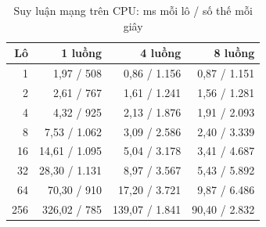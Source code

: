 \begin{table}[H]
  \centering
  \small
  \caption{Suy luận mạng trên CPU: ms mỗi lô / số thế mỗi giây}
  \label{tab:cs-tk-thongluong}
  \begin{tabular}{rrrr}
    \toprule
    Lô & 1 luồng & 4 luồng & 8 luồng \\
    \midrule
    1 & 1,97 / 508 & 0,86 / 1.156 & 0,87 / 1.151 \\
    2 & 2,61 / 767 & 1,61 / 1.241 & 1,56 / 1.281 \\
    4 & 4,32 / 925 & 2,13 / 1.876 & 1,91 / 2.093 \\
    8 & 7,53 / 1.062 & 3,09 / 2.586 & 2,40 / 3.339 \\
    16 & 14,61 / 1.095 & 5,04 / 3.178 & 3,41 / 4.687 \\
    32 & 28,30 / 1.131 & 8,97 / 3.567 & 5,43 / 5.892 \\
    64 & 70,30 / 910 & 17,20 / 3.721 & 9,87 / 6.486 \\
    256 & 326,02 / 785 & 139,07 / 1.841 & 90,40 / 2.832 \\
    \bottomrule
  \end{tabular}
\end{table}
